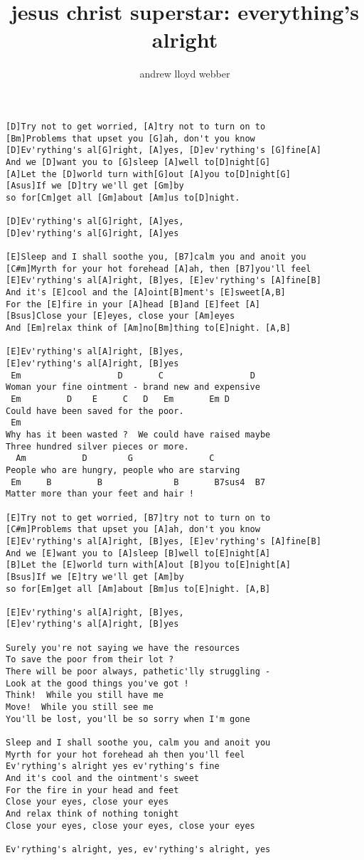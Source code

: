 \author{andrew lloyd webber}  
\title{jesus christ superstar: everything's alright}
\maketitle
\begin{verbatim}
[D]Try not to get worried, [A]try not to turn on to
[Bm]Problems that upset you [G]ah, don't you know
[D]Ev'rything's al[G]right, [A]yes, [D]ev'rything's [G]fine[A]
And we [D]want you to [G]sleep [A]well to[D]night[G]
[A]Let the [D]world turn with[G]out [A]you to[D]night[G]
[Asus]If we [D]try we'll get [Gm]by
so for[Cm]get all [Gm]about [Am]us to[D]night.

[D]Ev'rything's al[G]right, [A]yes,
[D]ev'rything's al[G]right, [A]yes

[E]Sleep and I shall soothe you, [B7]calm you and anoit you
[C#m]Myrth for your hot forehead [A]ah, then [B7]you'll feel
[E]Ev'rything's al[A]right, [B]yes, [E]ev'rything's [A]fine[B]
And it's [E]cool and the [A]oint[B]ment's [E]sweet[A,B]
For the [E]fire in your [A]head [B]and [E]feet [A]
[Bsus]Close your [E]eyes, close your [Am]eyes
And [Em]relax think of [Am]no[Bm]thing to[E]night. [A,B]

[E]Ev'rything's al[A]right, [B]yes,
[E]ev'rything's al[A]right, [B]yes
 Em                   D       C                 D
Woman your fine ointment - brand new and expensive
 Em         D    E     C   D   Em       Em D
Could have been saved for the poor.
 Em
Why has it been wasted ?  We could have raised maybe
Three hundred silver pieces or more.
  Am           D        G               C
People who are hungry, people who are starving
 Em     B         B              B       B7sus4  B7
Matter more than your feet and hair !

[E]Try not to get worried, [B7]try not to turn on to
[C#m]Problems that upset you [A]ah, don't you know
[E]Ev'rything's al[A]right, [B]yes, [E]ev'rything's [A]fine[B]
And we [E]want you to [A]sleep [B]well to[E]night[A]
[B]Let the [E]world turn with[A]out [B]you to[E]night[A]
[Bsus]If we [E]try we'll get [Am]by
so for[Em]get all [Am]about [Bm]us to[E]night. [A,B]

[E]Ev'rything's al[A]right, [B]yes,
[E]ev'rything's al[A]right, [B]yes

Surely you're not saying we have the resources
To save the poor from their lot ?
There will be poor always, pathetic'lly struggling -
Look at the good things you've got !
Think!  While you still have me
Move!  While you still see me
You'll be lost, you'll be so sorry when I'm gone

Sleep and I shall soothe you, calm you and anoit you
Myrth for your hot forehead ah then you'll feel
Ev'rything's alright yes ev'rything's fine
And it's cool and the ointment's sweet
For the fire in your head and feet
Close your eyes, close your eyes
And relax think of nothing tonight
Close your eyes, close your eyes, close your eyes

Ev'rything's alright, yes, ev'rything's alright, yes
\end{verbatim}